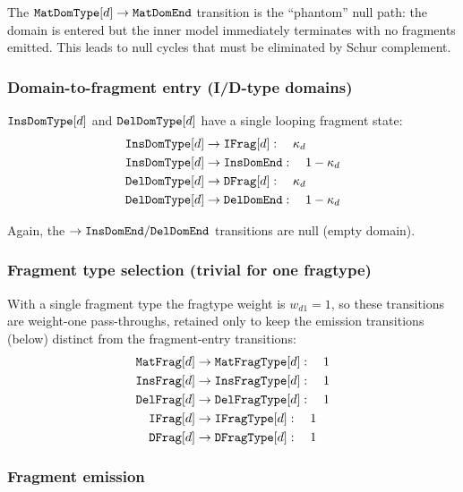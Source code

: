 \documentclass{article}
\begin{document}
The $\mathtt{MatDomType}[d] \to \mathtt{MatDomEnd}$ transition is the ``phantom''
null path: the domain is entered but the inner model immediately terminates
with no fragments emitted. This leads to null cycles that must be eliminated by Schur complement.

\subsubsection{Domain-to-fragment entry (I/D-type domains)}

$\mathtt{InsDomType}[d]$ and $\mathtt{DelDomType}[d]$ have a single looping fragment state:
\begin{align}
\mathtt{InsDomType}[d] &\to \mathtt{IFrag}[d]: \quad \kappa_d \\
\mathtt{InsDomType}[d] &\to \mathtt{InsDomEnd}: \quad 1 - \kappa_d \\
\mathtt{DelDomType}[d] &\to \mathtt{DFrag}[d]: \quad \kappa_d \\
\mathtt{DelDomType}[d] &\to \mathtt{DelDomEnd}: \quad 1 - \kappa_d
\end{align}

Again, the $\to \mathtt{InsDomEnd} / \mathtt{DelDomEnd}$ transitions are null (empty domain).

\subsubsection{Fragment type selection (trivial for one fragtype)}

With a single fragment type the fragtype weight is $w_{d1}=1$, so these
transitions are weight-one pass-throughs, retained only to keep the emission
transitions (below) distinct from the fragment-entry transitions:
\begin{align}
\mathtt{MatFrag}[d] &\to \mathtt{MatFragType}[d]: \quad 1 \\
\mathtt{InsFrag}[d] &\to \mathtt{InsFragType}[d]: \quad 1 \\
\mathtt{DelFrag}[d] &\to \mathtt{DelFragType}[d]: \quad 1 \\
\mathtt{IFrag}[d] &\to \mathtt{IFragType}[d]: \quad 1 \\
\mathtt{DFrag}[d] &\to \mathtt{DFragType}[d]: \quad 1
\end{align}

\subsubsection{Fragment emission}
\end{document}
